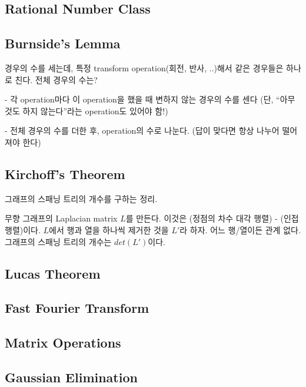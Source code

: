 \documentclass[10pt,landscape,a4paper,twocolumn]{article}
\begin{document}
\subsection{Rational Number Class}


\subsection{Burnside's Lemma}

경우의 수를 세는데, 특정 transform operation(회전, 반사, ..)해서 같은 경우들은 하나로 친다.
전체 경우의 수는?

- 각 operation마다 이 operation을 했을 때 변하지 않는 경우의 수를 센다
(단, ``아무것도 하지 않는다''라는 operation도 있어야 함!)

- 전체 경우의 수를 더한 후, operation의 수로 나눈다. (답이 맞다면 항상 나누어 떨어져야 한다)

\subsection{Kirchoff's Theorem}

그래프의 스패닝 트리의 개수를 구하는 정리.

무향 그래프의 Laplacian matrix $L$를 만든다. 이것은 (정점의 차수 대각 행렬) - (인접행렬)이다.
$L$에서 행과 열을 하나씩 제거한 것을 $L'$라 하자. 어느 행/열이든 관계 없다.
그래프의 스패닝 트리의 개수는 $det(L')$이다.

\subsection{Lucas Theorem}


\subsection{Fast Fourier Transform}


\subsection{Matrix Operations}


\subsection{Gaussian Elimination}

\end{document}
